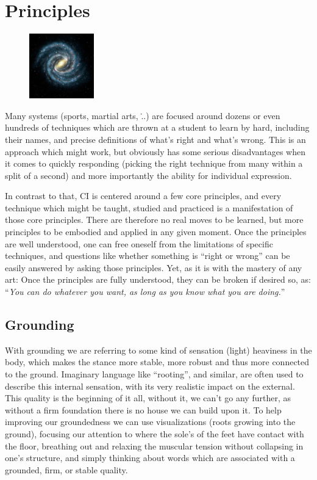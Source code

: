 \section{Principles}\label{sec:principles}

\begin{figure}
\centering
\includegraphics[width=0.25\textwidth]{images/principles}
\end{figure}

Many systems (sports, martial arts, \...) are focused around dozens or even hundreds of techniques which are thrown at a student to learn by hard, including their names, and precise definitions of what's right and what's wrong.
This is an approach which might work, but obviously has some serious disadvantages when it comes to quickly responding (picking the right technique from many within a split of a second) and more importantly the ability for individual expression.

In contrast to that, CI is centered around a few core principles, and every technique which might be taught, studied and practiced is a manifestation of those core principles.
There are therefore no real moves to be learned, but more principles to be embodied and applied in any given moment.
Once the principles are well understood, one can free oneself from the limitations of specific techniques, and questions like whether something is ``right or wrong'' can be easily answered by asking those principles.
Yet, as it is with the mastery of any art: Once the principles are fully understood, they can be broken if desired so, as: ``\textit{You can do whatever you want, as long as you know what you are doing.}''

\subsection{Grounding}\label{subsec:grounding}

With grounding we are referring to some kind of sensation (light) heaviness in the body, which makes the stance more stable, more robust and thus more connected to the ground.
Imaginary language like ``rooting'', and similar, are often used to describe this internal sensation, with its very realistic impact on the external.
This quality is the beginning of it all, without it, we can't go any further, as without a firm foundation there is no house we can build upon it.
To help improving our groundedness we can use visualizations (roots growing into the ground), focusing our attention to where the sole's of the feet have contact with the floor, breathing out and relaxing the muscular tension without collapsing in one's structure, and simply thinking about words which are associated with a grounded, firm, or stable quality.

